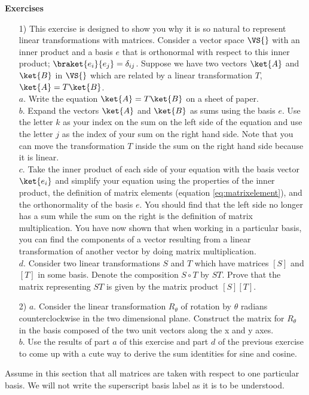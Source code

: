 \begin{flushleft}\textbf{Exercises}\end{flushleft}
\begin{itemize}
\item[1)] This exercise is designed to show you why it is so natural to represent linear transformations with matrices.  Consider a vector space $\VS{}$ with an inner product and a basis $e$ that is orthonormal with respect to this inner product; $\braket{e_i}{e_j}=\delta_{ij}$.  Suppose we have two vectors $\ket{A}$ and $\ket{B}$ in $\VS{}$ which are related by a linear transformation $T$, \mbox{$\ket{A} = T\ket{B}$.}\\
$a$. Write the equation $\ket{A} = T\ket{B}$ on a sheet of paper.\\
$b$. Expand the vectors $\ket{A}$ and $\ket{B}$ as sums using the basis $e$.  Use the letter $k$ as your index on the sum on the left side of the equation and use the letter $j$ as the index of your sum on the right hand side.  Note that you can move the transformation $T$ inside the sum on the right hand side because it is linear.\\
$c$. Take the inner product of each side of your equation with the basis vector $\ket{e_i}$ and simplify your equation using the properties of the inner product, the definition of matrix elements (equation \ref{eq:matrixelement}), and the orthonormality of the basis $e$.  You should find that the left side no longer has a sum while the sum on the right is the definition of matrix multiplication. You have now shown that when working in a particular basis, you can find the components of a vector resulting from a linear transformation of another vector by doing matrix multiplication. \\
$d$. Consider two linear transformations $S$ and $T$ which have matrices $[S]$ and $[T]$ in some basis.  Denote the composition $S \circ T$ by $ST$.  Prove that the matrix representing $ST$ is given by the matrix product $[S][T]$.
\item[2)] $a$. Consider the linear transformation $R_{\theta}$ of rotation by $\theta$ radians counterclockwise in the two dimensional plane.  Construct the matrix for $R_{\theta}$ in the basis composed of the two unit vectors along the x and y axes.\\$b$.  Use the results of part $a$ of this exercise and part $d$ of the previous exercise to come up with a cute way to derive the sum identities for sine and cosine.
\end{itemize}
Assume in this section that all matrices are taken with respect to one particular basis.  We will not write the superscript basis label as it is to be understood.

